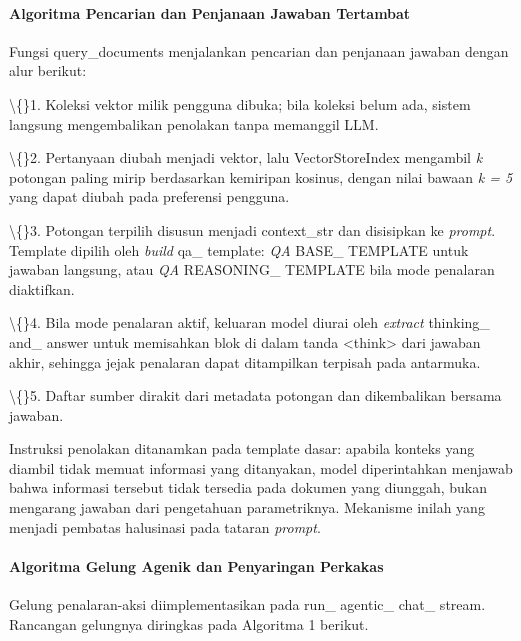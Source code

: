 \documentclass[12pt,a4paper]{article}
\begin{document}
\paragraph*{Algoritma Pencarian dan Penjanaan Jawaban Tertambat}

Fungsi query\_documents menjalankan pencarian dan penjanaan jawaban dengan alur berikut:



\textbackslash\{\}1. Koleksi vektor milik pengguna dibuka; bila koleksi belum ada, sistem langsung mengembalikan penolakan tanpa memanggil LLM.



\textbackslash\{\}2. Pertanyaan diubah menjadi vektor, lalu VectorStoreIndex mengambil \textit{k} potongan paling mirip berdasarkan kemiripan kosinus, dengan nilai bawaan \textit{k = 5} yang dapat diubah pada preferensi pengguna.



\textbackslash\{\}3. Potongan terpilih disusun menjadi context\_str dan disisipkan ke \textit{prompt}. Template dipilih oleh \textit{build} qa\_ template: \textit{QA} BASE\_ TEMPLATE untuk jawaban langsung, atau \textit{QA} REASONING\_ TEMPLATE bila mode penalaran diaktifkan.



\textbackslash\{\}4. Bila mode penalaran aktif, keluaran model diurai oleh \textit{extract} thinking\_ and\_ answer untuk memisahkan blok di dalam tanda \textless{}think\textgreater{} dari jawaban akhir, sehingga jejak penalaran dapat ditampilkan terpisah pada antarmuka.



\textbackslash\{\}5. Daftar sumber dirakit dari metadata potongan dan dikembalikan bersama jawaban.



Instruksi penolakan ditanamkan pada template dasar: apabila konteks yang diambil tidak memuat informasi yang ditanyakan, model diperintahkan menjawab bahwa informasi tersebut tidak tersedia pada dokumen yang diunggah, bukan mengarang jawaban dari pengetahuan parametriknya. Mekanisme inilah yang menjadi pembatas halusinasi pada tataran \textit{prompt}.



\paragraph*{Algoritma Gelung Agenik dan Penyaringan Perkakas}

Gelung penalaran-aksi diimplementasikan pada run\_ agentic\_ chat\_ stream. Rancangan gelungnya diringkas pada Algoritma 1 berikut.
\end{document}
